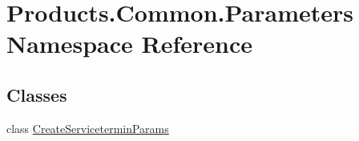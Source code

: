\hypertarget{namespace_products_1_1_common_1_1_parameters}{}\section{Products.\+Common.\+Parameters Namespace Reference}
\label{namespace_products_1_1_common_1_1_parameters}
\subsection*{Classes}
\begin{DoxyCompactItemize}
\item 
class \hyperlink{class_products_1_1_common_1_1_parameters_1_1_create_servicetermin_params}{Create\+Servicetermin\+Params}
\end{DoxyCompactItemize}
